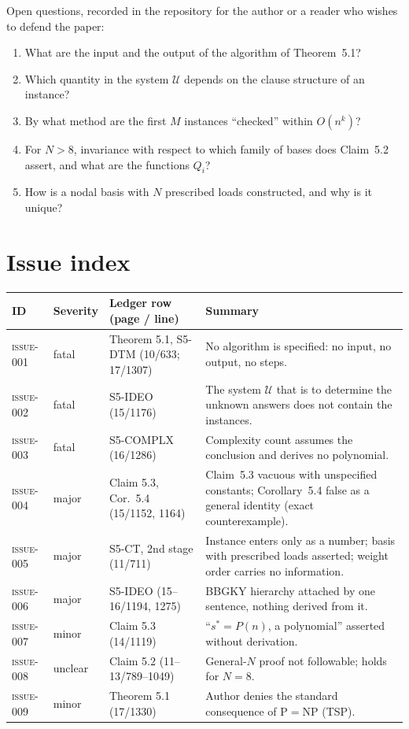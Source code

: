 \documentclass[11pt,a4paper]{article}
\newcommand{\issue}[1]{\textrm{\mdseries\textsc{issue-#1}}}
\begin{document}
Open questions, recorded in the repository for the author or a reader who wishes to defend the paper:
\begin{enumerate}
\item What are the input and the output of the algorithm of Theorem~5.1?
\item Which quantity in the system $\mathcal U$ depends on the clause structure of an instance?
\item By what method are the first $M$ instances ``checked'' within $O(n^k)$?
\item For $N>8$, invariance with respect to which family of bases does Claim~5.2 assert, and what are the functions $Q_i$?
\item How is a nodal basis with $N$ prescribed loads constructed, and why is it unique?
\end{enumerate}

\appendix

\section{Issue index}

\begin{center}
\begin{tabular}{@{}ll>{\raggedright\arraybackslash}p{4.6cm}>{\raggedright\arraybackslash}p{6.2cm}@{}}
\toprule
ID & Severity & Ledger row (page / line) & Summary \\
\midrule
\issue{001} & fatal & Theorem 5.1, S5-DTM (10/633; 17/1307) & No algorithm is specified: no input, no output, no steps.\\
\issue{002} & fatal & S5-IDEO (15/1176) & The system $\mathcal U$ that is to determine the unknown answers does not contain the instances.\\
\issue{003} & fatal & S5-COMPLX (16/1286) & Complexity count assumes the conclusion and derives no polynomial.\\
\issue{004} & major & Claim 5.3, Cor.~5.4 (15/1152, 1164) & Claim~5.3 vacuous with unspecified constants; Corollary~5.4 false as a general identity (exact counterexample).\\
\issue{005} & major & S5-CT, 2nd stage (11/711) & Instance enters only as a number; basis with prescribed loads asserted; weight order carries no information.\\
\issue{006} & major & S5-IDEO (15--16/1194, 1275) & BBGKY hierarchy attached by one sentence, nothing derived from it.\\
\issue{007} & minor & Claim 5.3 (14/1119) & ``$s^*=P(n)$, a polynomial'' asserted without derivation.\\
\issue{008} & unclear & Claim 5.2 (11--13/789--1049) & General-$N$ proof not followable; holds for $N=8$.\\
\issue{009} & minor & Theorem 5.1 (17/1330) & Author denies the standard consequence of $\mathrm P=\mathrm{NP}$ (TSP).\\
\bottomrule
\end{tabular}
\end{center}
\end{document}
